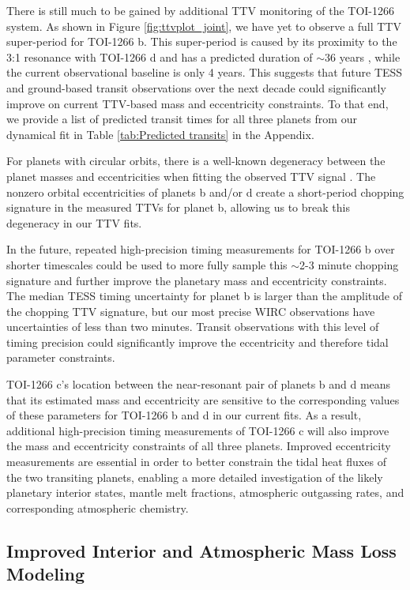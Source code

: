 \documentclass[twocolumn]{aastex631}
\begin{document}
There is still much to be gained by additional TTV monitoring of the TOI-1266 system. As shown in Figure \ref{fig:ttvplot_joint}, we have yet to observe a full TTV super-period for TOI-1266 b. This super-period is caused by its proximity to the 3:1 resonance with TOI-1266 d and has a predicted duration of $\sim$36 years \citep{Deck_2016}, while the current observational baseline is only 4 years.  This suggests that future TESS and ground-based transit observations over the next decade could significantly improve on current TTV-based mass and eccentricity constraints.  To that end, we provide a list of predicted transit times for all three planets from our dynamical fit in Table \ref{tab:Predicted transits} in the Appendix.

For planets with circular orbits, there is a well-known degeneracy between the planet masses and eccentricities when fitting the observed TTV signal \citep{Lithwick_2012}. The nonzero orbital eccentricities of planets b and/or d create a short-period chopping signature in the measured TTVs for planet b, allowing us to break this degeneracy in our TTV fits.  
 
In the future, repeated high-precision timing measurements for TOI-1266 b over shorter timescales could be used to more fully sample this $\sim$2-3 minute chopping signature and further improve the planetary mass and eccentricity constraints. The median TESS timing uncertainty for planet b is larger than the amplitude of the chopping TTV signature, but our most precise WIRC observations have uncertainties of less than two minutes. Transit observations with this level of timing precision could significantly improve the eccentricity and therefore tidal parameter constraints.     

TOI-1266 c's location between the near-resonant pair of planets b and d means that its estimated mass and eccentricity are sensitive to the corresponding values of these parameters for TOI-1266 b and d in our current fits. As a result, additional high-precision timing measurements of TOI-1266 c will also improve the mass and eccentricity constraints of all three planets. Improved eccentricity measurements are essential in order to better constrain the tidal heat fluxes of the two transiting planets, enabling a more detailed investigation of the likely planetary interior states, mantle melt fractions, atmospheric outgassing rates, and corresponding atmospheric chemistry.

\subsection{Improved Interior and Atmospheric Mass Loss Modeling}
\end{document}
